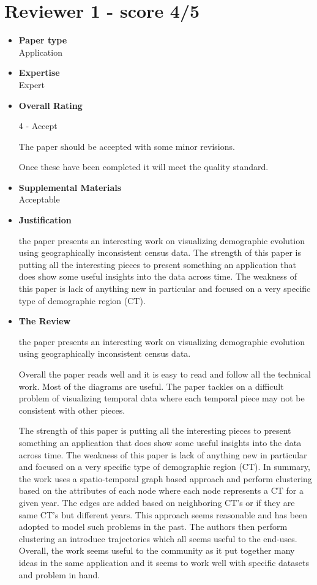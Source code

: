 \documentclass{article}
\begin{document}
\section{Reviewer 1 - score 4/5}

\begin{itemize}
\item{\textbf{Paper type}\\Application}
\item{\textbf{Expertise}\\Expert}
\item{\textbf{Overall Rating}

    4 - Accept
    
    The paper should be accepted with some minor
    revisions.
    
    Once these have been completed it will meet the quality standard.}

\item{\textbf{Supplemental Materials}\\Acceptable}

\item{\textbf{Justification}

    the paper presents an interesting work on visualizing demographic evolution using
    geographically inconsistent census data. The strength of this paper is putting all
    the interesting pieces to present something an application that does show some
    useful insights into the data across time. The weakness of this paper is lack of
    anything new in particular and focused on a very specific type of demographic
    region (CT).
}
\item{\textbf{The Review}

    the paper presents an interesting work on visualizing demographic evolution using
    geographically inconsistent census data.

    Overall the paper reads well and it is easy to read and follow all the technical
    work. Most of the diagrams are useful. The paper tackles on a difficult problem of
    visualizing temporal data where each temporal piece may not be consistent with
    other pieces.

    The strength of this paper is putting all the interesting pieces to present
    something an application that does show some useful insights into the data across
    time. The weakness of this paper is lack of anything new in particular and focused
    on a very specific type of demographic region (CT). In summary, the work uses a
    spatio-temporal graph based approach and perform clustering based on the
    attributes of each node where each node represents a CT for a given year. The
    edges are added based on neighboring CT's or if they are same CT's but different
    years. This approach seems reasonable and has been adopted to model such problems
    in the past. The authors then perform clustering an introduce trajectories which
    all seems useful to the end-uses. Overall, the work seems useful to the community
    as it put together many ideas in the same application and it seems to work well
    with specific datasets and problem in hand.

}
\end{itemize}
\end{document}
